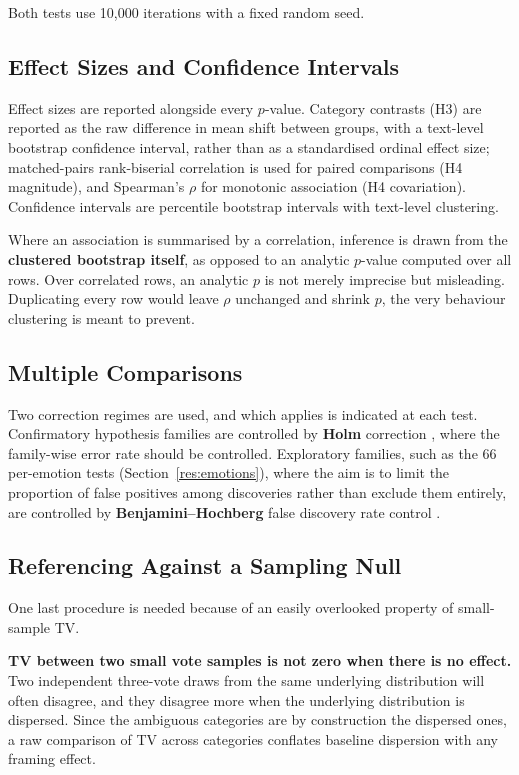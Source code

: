 Both tests use 10{,}000 iterations with a fixed random seed.

\subsection{Effect Sizes and Confidence Intervals}
\label{impl:effects}

\noindent
Effect sizes are reported alongside every $p$-value. Category contrasts (H3) are reported as the
raw difference in mean shift between groups, with a text-level bootstrap confidence interval,
rather than as a standardised ordinal effect size; matched-pairs rank-biserial correlation is used
for paired comparisons (H4 magnitude), and Spearman's $\rho$ for monotonic association (H4
covariation). Confidence intervals are percentile bootstrap intervals with text-level clustering.

Where an association is summarised by a correlation, inference is drawn from the
\textbf{clustered bootstrap itself}, as opposed to an analytic $p$-value computed over all rows. Over correlated rows, an
analytic $p$ is not merely imprecise but misleading. Duplicating every row would leave $\rho$
unchanged and shrink $p$, the very behaviour clustering is meant to prevent.

\subsection{Multiple Comparisons}
\label{impl:multiple}

\noindent
Two correction regimes are used, and which applies is indicated at each test. Confirmatory
hypothesis families are controlled by \textbf{Holm} correction \cite{Holm1979Sequential}, where
the family-wise error rate should be controlled. Exploratory families, such as the 66 per-emotion
tests (Section~\ref{res:emotions}), where the aim is to limit the proportion of false positives
among discoveries rather than exclude them entirely, are controlled by \textbf{Benjamini--Hochberg}
false discovery rate control \cite{Benjamini1995FDR}.

\subsection{Referencing Against a Sampling Null}
\label{impl:nullref}

\noindent
One last procedure is needed because of an easily overlooked property of small-sample TV.

\textbf{TV between two small vote samples is not zero when there is no effect.} Two independent
three-vote draws from the same underlying distribution will often disagree, and they disagree
more when the underlying distribution is dispersed. Since the ambiguous categories are by
construction the dispersed ones, a raw comparison of TV across categories conflates baseline
dispersion with any framing effect.

